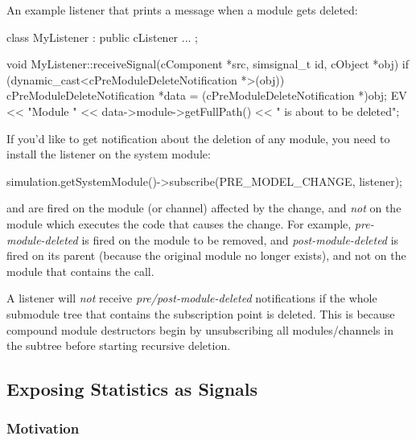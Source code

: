 An example listener that prints a message when a module gets deleted:

\begin{cpp}
class MyListener : public cListener
{
   ...
};

void MyListener::receiveSignal(cComponent *src, simsignal_t id, cObject *obj)
{
    if (dynamic_cast<cPreModuleDeleteNotification *>(obj))
    {
        cPreModuleDeleteNotification *data = (cPreModuleDeleteNotification *)obj;
        EV << "Module " << data->module->getFullPath() << " is about to be deleted\n";
    }
}
\end{cpp}

If you'd like to get notification about the deletion of any module, you need
to install the listener on the system module:

\begin{cpp}
simulation.getSystemModule()->subscribe(PRE_MODEL_CHANGE, listener);
\end{cpp}

\begin{note}
   and  are fired on the
  module (or channel) affected by the change, and \textit{not} on the module
  which executes the code that causes the change. For example,
  \textit{pre-module-deleted} is fired on the module to be removed, and
  \textit{post-module-deleted} is fired on its parent (because the original
  module no longer exists), and not on the module that contains the
   call.
\end{note}

\begin{note}
  A listener will \textit{not} receive \textit{pre/post-module-deleted}
  notifications if the whole submodule tree that contains the subscription
  point is deleted. This is because compound module destructors begin
  by unsubscribing all modules/channels in the subtree before starting
  recursive deletion.
\end{note}


\subsection{Exposing Statistics as Signals}
\label{sec:ch-simple-modules:statistic-signals}

\subsubsection{Motivation}

